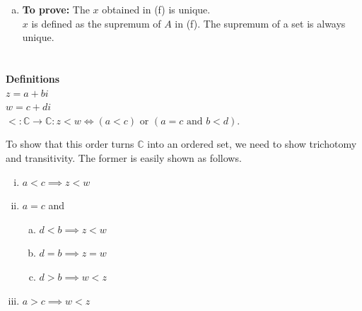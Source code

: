 \documentclass[12pt]{article}
\begin{document}
\begin{enumerate}[(a)]
\begin{proof}
\begin{enumerate}[(i)]
                              which implies $x + 1/n \in A$. However, it is given that $x$ is an upper bound
                              of $A$. \hfill $\Rightarrow\Leftarrow$
                        \item $b^x > y$ \\
                              From 7(e), there exists $n \in \mathbb{Z}^+$ such that $b^{x-1/n} >y$.
                              Clearly, $x - 1/n$ is an upper bound of A.
                              However, it is given that $x$ is the smallest upper bound
                              of $A$. \hfill $\Rightarrow\Leftarrow$
                  \end{enumerate}
            \end{proof}
      \item
            {\bf To prove:} The $x$ obtained in (f) is unique.\\
            $x$ is defined as the supremum of $A$ in (f). The supremum of a set is always unique.
\end{enumerate}
\section{}
 {\bf Definitions}\\
$z = a + bi$\\
$w = c + di$\\
$<:\mathbb{C} \rightarrow \mathbb{C}: z<w \iff (a<c) \text{ or } (a = c \text{ and } b < d)$.

To show that this order turns $\mathbb{C}$ into an ordered set, we need to show trichotomy
and transitivity. The former is easily shown as follows.
\begin{enumerate}[(i)]
      \item $a < c \implies z < w$
      \item $a = c$ and
            \begin{enumerate}[(a)]
                  \item $d < b \implies z < w$
                  \item $d = b \implies z = w$
                  \item $d > b \implies w < z$
            \end{enumerate}
      \item $a > c\implies w < z$
\end{enumerate}
\end{document}
